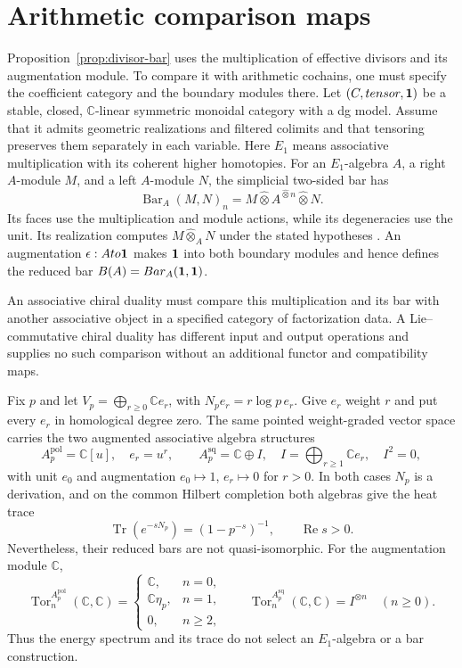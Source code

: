 \section{Arithmetic comparison maps}
\label{sec:arithmetic-comparison}

Proposition~\ref{prop:divisor-bar} uses the multiplication of effective
divisors and its augmentation module. To compare it with arithmetic cochains,
one must specify the coefficient category and the boundary modules there.  Let \((C,tensor,\mathbf 1)\) be a stable, closed,
\(\mathbb C\)-linear symmetric monoidal category with a dg model.  Assume
that it admits geometric realizations and filtered colimits and that
tensoring preserves them separately in each variable. Here $E_1$ means
associative multiplication with its coherent higher homotopies. For an
\(E_1\)-algebra \(A\), a right \(A\)-module \(M\), and a left
\(A\)-module \(N\), the simplicial two-sided bar has
\[
 \operatorname{Bar}_A(M,N)_n
 =M\widehat\otimes A^{\widehat\otimes n}\widehat\otimes N.
\]
Its faces use the multiplication and module actions, while its degeneracies
use the unit.  Its realization computes \(M\widehat\otimes_A N\) under the
stated hypotheses
\cite[Construction~4.4.2.7 and Theorem~4.4.2.8]{LurieHA}.  An augmentation
\(\epsilon:Ato\mathbf 1\) makes \(\mathbf 1\) into both boundary modules and hence
defines the reduced bar \(B(A)=Bar_A(\mathbf 1,\mathbf 1)\).

An associative chiral duality must compare this multiplication
and its bar with another associative object in a specified category of
factorization data. A Lie--commutative chiral duality has different input
and output operations and supplies no such comparison without an
additional functor and compatibility maps.

\begin{proposition}
\label{prop:two-bars}
Fix \(p\) and let
\(V_p=\bigoplus_{r\geq0}\mathbb C e_r\), with
\(N_pe_r=r\log p\,e_r\).  Give $e_r$ weight $r$ and put every $e_r$ in homological degree zero.
The same pointed weight-graded vector space carries the
two augmented associative algebra structures
\[
 A_p^{\mathrm{pol}}=\mathbb C[u],\quad e_r=u^r,
 \qquad
 A_p^{\mathrm{sq}}=\mathbb C\oplus I,\quad
 I=\bigoplus_{r\geq1}\mathbb C e_r,\quad I^2=0,
\]
with unit \(e_0\) and augmentation \(e_0\mapsto1\),
\(e_r\mapsto0\) for \(r>0\).  In both cases \(N_p\) is a derivation, and
on the common Hilbert completion both algebras give the heat trace
\[
 \operatorname{Tr}(e^{-sN_p})=(1-p^{-s})^{-1},
 \qquad \operatorname{Re}s>0.
\]
Nevertheless, their reduced bars are not quasi-isomorphic.  For the
augmentation module \(\mathbb C\),
\[
 \operatorname{Tor}^{A_p^{\mathrm{pol}}}_n(\mathbb C,\mathbb C)
 =\begin{cases}
   \mathbb C,&n=0,\\
   \mathbb C\eta_p,&n=1,\\
   0,&n\geq2,
  \end{cases}
 \qquad
 \operatorname{Tor}^{A_p^{\mathrm{sq}}}_n(\mathbb C,\mathbb C)
 =I^{\otimes n}\quad(n\geq0).
\]
Thus the energy spectrum and its trace do not select an \(E_1\)-algebra or
a bar construction.
\end{proposition}

